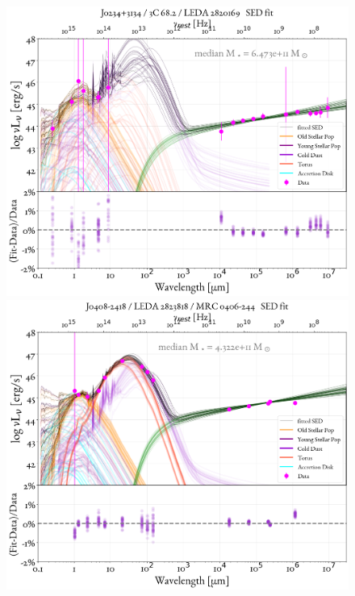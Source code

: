 \begin{figure}
    \centering
    \includegraphics[width=0.85\linewidth]{figures/ResultFits/113_SEDfit_5349.png}\\
    \includegraphics[width=0.85\linewidth]{figures/ResultFits/114_SEDfit_5353.png}    
\end{figure}
